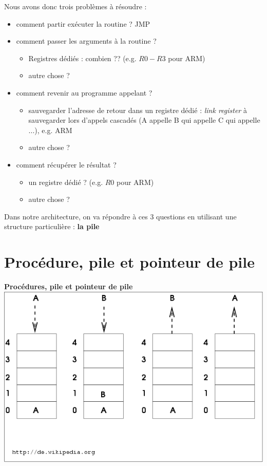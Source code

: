 \documentclass{beamer}
\begin{document}
\begin{frame}
Nous avons donc trois problèmes à résoudre :
\begin{itemize}
\item comment partir exécuter la routine ? JMP
\item comment passer les arguments à la routine ? 
\begin{itemize}
\item Registres dédiés : combien ?? (e.g. $R0-R3$ pour ARM)
  \item autre chose ?
\end{itemize}
\item comment revenir au programme appelant ? 
\begin{itemize}
\item sauvegarder l'adresse de retour dans un registre dédié : \emph{link register} à sauvegarder lors d'appels cascadés  (A appelle B qui appelle C qui appelle ...), e.g. ARM
\item autre chose ?
\end{itemize}
\item comment récupérer le résultat ?
  \begin{itemize}
  \item un registre dédié ? (e.g. $R0$ pour ARM)
  \item autre chose ?
  \end{itemize}
\end{itemize}
\vspace{1cm}
Dans notre architecture, on va répondre à ces 3 questions en utilisant une structure particulière : \textbf{la pile}
\end{frame}

\section{Procédure, pile et pointeur de pile} 

\begin{frame}
\begin{center}
\textbf{Procédures, pile et pointeur de pile}\\
\vspace{1cm}
\centering\includegraphics[width=0.5\linewidth]{Figs/Lifo.png}
\end{center}
\end{frame}
\end{document}
